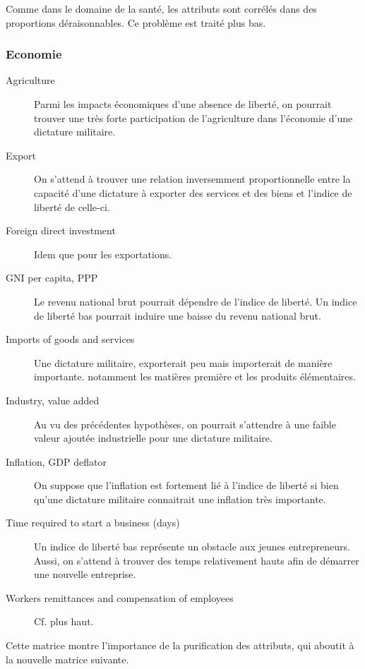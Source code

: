 Comme dans le domaine de la santé, les attributs sont corrélés dans des proportions déraisonnables. Ce problème est traité plus bas.

\subsubsection{Economie}
\begin{description}
\item [Agriculture]
Parmi les impacts économiques d'une absence de liberté, on pourrait trouver une très forte participation de l'agriculture dans l'économie d'une dictature militaire.
\item [Export]
On s'attend à trouver une relation inversemment proportionnelle entre la capacité d'une dictature à exporter des services et des biens et l'indice de liberté de celle-ci.
\item [Foreign direct investment]
Idem que pour les exportations. 
\item [GNI per capita, PPP ]
Le revenu national brut pourrait dépendre de l'indice de liberté. Un indice de liberté bas pourrait induire une baisse du revenu national brut.
\item [Imports of goods and services] 
Une dictature militaire, exporterait peu mais importerait de manière importante. notamment les matières première et les produits élémentaires.
\item [Industry, value added]
Au vu des précédentes hypothèses, on pourrait s'attendre à une faible valeur ajoutée industrielle pour une dictature militaire. 
\item [Inflation, GDP deflator] 
On suppose que l'inflation est fortement lié à l'indice de liberté si bien qu'une dictature militaire connaitrait une inflation très importante.
\item [Time required to start a business (days)]
Un indice de liberté bas représente un obstacle aux jeunes entrepreneurs. Aussi, on s'attend à trouver des temps relativement hauts afin de démarrer une nouvelle entreprise. 
\item [Workers remittances and compensation of employees]
Cf. plus haut.
\end{description}

Cette matrice montre l'importance de la purification des attributs, qui aboutit à la nouvelle matrice suivante.

